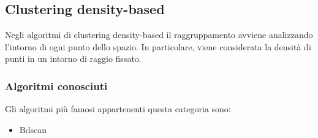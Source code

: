 \subsection{Clustering density-based}
	Negli algoritmi di clustering density-based il raggruppamento avviene analizzando l'intorno di ogni punto dello spazio. In particolare, viene considerata la densità di punti in un intorno di raggio fissato.
	
	\subsubsection{Algoritmi conosciuti}		
		Gli algoritmi più famosi appartenenti questa categoria sono:
		\begin{itemize}
		  	\item Bdscan
		\end{itemize}